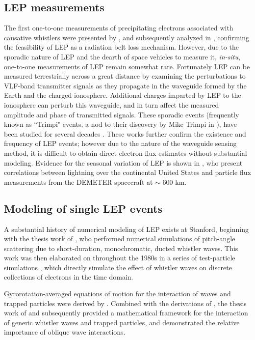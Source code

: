 
\subsection{LEP measurements}
The first one-to-one measurements of precipitating electrons associated with causative whistlers were presented by \cite{Voss1984}, and subsequently analyzed in \cite{Voss1998}, confirming the feasibility of LEP as a radiation belt loss mechanism. However, due to the sporadic nature of LEP and the dearth of space vehicles to measure it, \emph{in-situ}, one-to-one measurements of LEP remain somewhat rare.
Fortunately LEP can be measured terrestrially across a great distance by examining the perturbations to VLF-band transmitter signals as they propagate in the waveguide formed by the Earth and the charged ionosphere. Additional charges imparted by LEP to the ionosphere can perturb this waveguide, and in turn affect the measured amplitude and phase of transmitted signals. These sporadic events (frequently known as ``Trimpi" events, a nod to their discovery by Mike Trimpi in \cite{Trimpi1973}), have been studied for several decades \citep{Trimpi1973, Carpenter1984, Inan1988, Burgess1993}. These works further confirm the existence and frequency of LEP events; however due to the nature of the waveguide sensing method, it is difficult to obtain direct electron flux estimates without substantial modeling. Evidence for the seasonal variation of LEP is shown in \cite{Gemelos2009}, who present correlations between lightning over the continental United States and particle flux measurements from the DEMETER spacecraft at $\sim$ 600 km.

\subsection{Modeling of single LEP events}
A substantial history of numerical modeling of LEP exists at Stanford, beginning with the thesis work of \cite{Inan1977}, who performed numerical simulations of pitch-angle scattering due to short-duration, monochromatic, ducted whistler waves. This work was then elaborated on throughout the 1980s in a series of test-particle simulations \citep{Inan1982, Chang1983, Chang1983b, Chang1985, Inan1989}, which directly simulate the effect of whistler waves on discrete collections of electrons in the time domain.

Gyrorotation-averaged equations of motion for the interaction of waves and trapped particles were derived by \cite{Bell1984}. Combined with the derivations of \cite{Ristic1992}, the thesis work of \cite{Ristic1993} and subsequently \cite{Ristic1998} provided a mathematical framework for the interaction of generic whistler waves and trapped particles, and demonstrated the relative importance of oblique wave interactions. 

